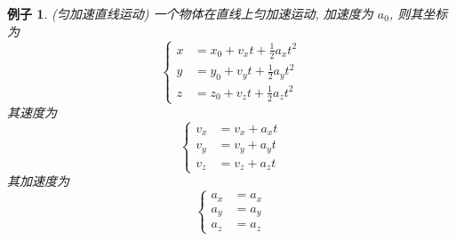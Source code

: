 \documentclass{ctexart}
\numberwithin{equation}{subsection}
\numberwithin{theorem}{subsection}
\numberwithin{definition}{subsection}
\numberwithin{proof}{subsection}
\numberwithin{lemma}{subsection}
\newtheorem{example}    {例子}
\numberwithin{example}{subsection}
\numberwithin{remark}{subsection}
\numberwithin{corollary}{subsection}
\numberwithin{exercise}{subsection}
\numberwithin{problem}{subsection}
\numberwithin{question}{section}
\numberwithin{method}{subsection}
\begin{document}
    \begin{example}
        \label{1.2 ex:constant acceleration}
        (匀加速直线运动) 一个物体在直线上匀加速运动, 加速度为
        \(a_0\), 则其坐标为
        \begin{equation}
            \begin{cases}
                x &= x_0 + v_x t + \frac{1}{2} a_x t^2 \\
                y &= y_0 + v_y t + \frac{1}{2} a_y t^2 \\
                z &= z_0 + v_z t + \frac{1}{2} a_z t^2
            \end{cases}
        \end{equation}
        其速度为
        \begin{equation}
            \begin{cases}
                v_x &= v_x + a_x t \\
                v_y &= v_y + a_y t \\
                v_z &= v_z + a_z t
            \end{cases}
        \end{equation}
        其加速度为
        \begin{equation}
            \begin{cases}
                a_x &= a_x \\
                a_y &= a_y \\
                a_z &= a_z
            \end{cases}
        \end{equation}
    \end{example}
\end{document}
